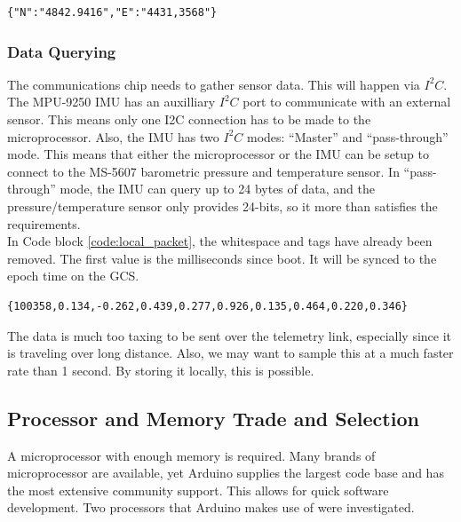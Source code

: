 \begin{lstlisting}
{"N":"4842.9416","E":"4431,3568"}
\end{lstlisting}

\subsubsection{Data Querying}

The communications chip needs to gather sensor data. This will happen via $I^2C$. The MPU-9250 IMU\cite{iven} has an auxilliary $I^2C$ port to communicate with an external sensor. This means only one I2C connection has to be made to the microprocessor. Also, the IMU has two $I^2C$ modes: “Master” and “pass-through” mode. This means that either the microprocessor or the IMU can be setup to connect to the MS-5607 barometric pressure and temperature sensor\cite{par}. In “pass-through” mode, the IMU can query up to 24 bytes of data, and the pressure/temperature sensor only provides 24-bits, so it more than satisfies the requirements.\\

In Code block \ref{code:local_packet}, the whitespace and tags have already been removed. The first value is the milliseconds since boot. It will be synced to the epoch time on the GCS. 

\begin{lstlisting}
{100358,0.134,-0.262,0.439,0.277,0.926,0.135,0.464,0.220,0.346}
\end{lstlisting}

The data is much too taxing to be sent over the telemetry link, especially since it is traveling over long distance. Also, we may want to sample this at a much faster rate than 1 second. By storing it locally, this is possible.\\


\subsection{Processor and Memory Trade and Selection}
A microprocessor with enough memory is required. Many brands of microprocessor are available, yet Arduino supplies the largest code base and has the most extensive community support. This allows for quick software development. Two processors that Arduino makes use of were investigated.\\

